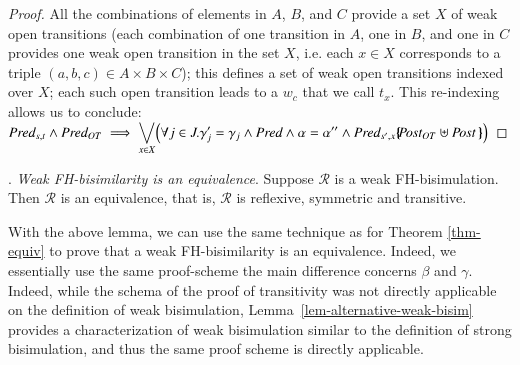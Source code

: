\documentclass{elsarticle}
\begin{document}
\begin{proof}
All the combinations of elements in $A$, $B$, and $C$ provide a set $X$ of weak open transitions (each combination of one transition in $A$, one in $B$, and one in $C$ provides one weak open transition in the set $X$, i.e. each $x\in X$ corresponds to a triple $(a,b,c)\in A\times B\times C$); this defines a set of weak open transitions indexed over $X$;  each such open transition leads to a $w_c$ that we call $t_x$. This re-indexing allows us to conclude:\\
$\Pred_{s,t} \land \Pred_{OT}\implies
 \displaystyle{\bigvee_{x\in X}} 
\Big(\forall j\in J.\gamma_j'=\gamma_j \land  \Pred \land \alpha=\alpha''  \land \Pred_{s',x}\subst{\Post_{OT}\uplus\Post\,}\Big)$
\end{proof}

\fussy
{}. \emph{Weak FH-bisimilarity is an equivalence}.
 Suppose $\mathcal{R}$ 
is a weak FH-bisimulation. Then $\mathcal{R}$ is an equivalence, that is, $\mathcal{R}$ is 
reflexive, symmetric and transitive.
\sloppy

With the above lemma, we can use the same technique as for Theorem \ref{thm-equiv}  to prove that a weak FH-bisimilarity is an equivalence. Indeed, we essentially use the same proof-scheme the main difference concerns  $\beta$ and  $\gamma$. Indeed, while the schema of the proof of transitivity was not directly applicable on the definition of weak bisimulation,  Lemma~\ref{lem-alternative-weak-bisim} provides a characterization of weak bisimulation similar to the definition of strong bisimulation, and thus the same proof scheme is directly applicable.

 

       		



       		
\end{document}
